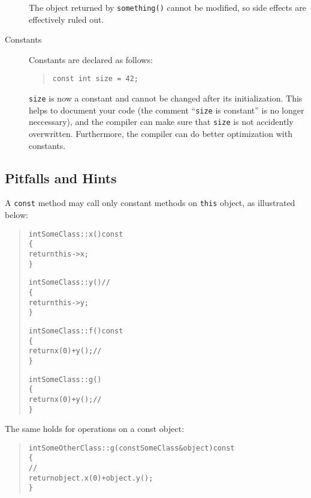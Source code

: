 \begin{description}
  The object returned by \texttt{something()} cannot be modified,
  so side effects are effectively ruled out.

  
  \item[Constants]

  Constants are declared as follows:
  \begin{quote}
\begin{verbatim}
const int size = 42;
\end{verbatim}
  \end{quote}
  
  \texttt{size} is now a constant and cannot be changed after its
  initialization. This helps to document your code (the comment
  ``\texttt{size} is constant'' is no longer neccessary), and the
  compiler can make sure that \texttt{size} is not accidently
  overwritten. Furthermore, the compiler can do better
  optimization with constants.

\end{description}

%
%

\subsection{Pitfalls and Hints}

A \texttt{const} method may call only constant methods on 
\texttt{this} object, as illustrated below:

\begin{quote}
\begin{alltt}
int SomeClass::x() const
\{
    return this->x;
\}

int SomeClass::y() // 
\{
    return this->y;
\}

int SomeClass::f() const
\{
    return x(0) + y(); // 
\}

int SomeClass::g()
\{
    return x(0) + y(); // 
\}
\end{alltt}
\end{quote}

\noindent The same holds for operations on a 
const object:

\begin{quote}
\begin{alltt}
int SomeOtherClass::g(const SomeClass& object) const
\{
    // 
    return object.x(0) + object.y();
\}
\end{alltt}
\end{quote}

